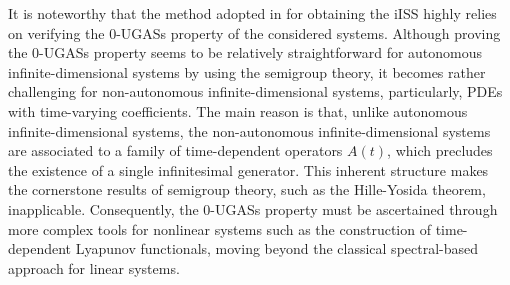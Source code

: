 \documentclass[onecolumn]{autart}
\newenvironment{proof of Prop.ODE}{{\it Proof of Proposition~\ref{Prop.ODE}:\enspace}}{\hfill $\blacksquare$\par}
\newenvironment{proof of PDE}{{\it Proof of Proposition \ref{Prop.8}:\enspace}}{\hfill $\blacksquare$\par}
\begin{document}
It is noteworthy that  the  method adopted in {\cite{mironchenko2016MCRF,mironchenko2020SIAM,Hosfeld2022,damak2021input,damak2023input,Heni:2025,JoseL2023}} for obtaining the iISS  highly relies on verifying the 0-UGASs property of the  considered systems.    Although proving the 0-UGASs property seems to be relatively straightforward for autonomous infinite-dimensional systems by using the semigroup theory, it becomes  rather challenging for non-autonomous infinite-dimensional systems{, particularly, PDEs with time-varying coefficients.}
The main reason is that, unlike   autonomous infinite-dimensional systems, the non-autonomous infinite-dimensional systems are associated to a family of time-dependent operators $A(t)$,   which precludes  the existence of a single infinitesimal generator. This inherent structure makes the cornerstone results of semigroup theory, such as the Hille-Yosida theorem,  inapplicable. %
Consequently, the 0-UGASs property  must be ascertained through more complex  tools  for nonlinear systems such as  the construction of time-dependent Lyapunov functionals, moving beyond the classical spectral-based approach for linear systems.


%
\end{document}
